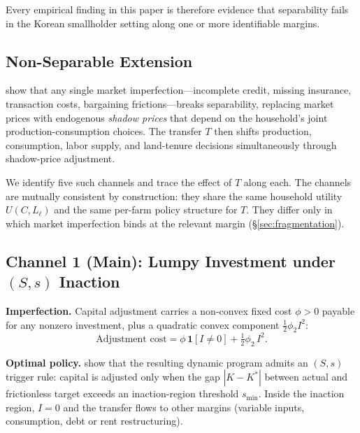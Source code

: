 Every empirical finding in this paper is therefore evidence that separability fails in the Korean smallholder setting along one or more identifiable margins.

\subsection{Non-Separable Extension}
\label{sec:nonseparable}

\citet{deJanvryFafchampsSadoulet1991_peasant} show that any single market imperfection---incomplete credit, missing insurance, transaction costs, bargaining frictions---breaks separability, replacing market prices with endogenous \emph{shadow prices} that depend on the household's joint production-consumption choices. The transfer $T$ then shifts production, consumption, labor supply, and land-tenure decisions simultaneously through shadow-price adjustment.

We identify five such channels and trace the effect of $T$ along each. The channels are mutually consistent by construction: they share the same household utility $U(C, L_\ell)$ and the same per-farm policy structure for $T$. They differ only in which market imperfection binds at the relevant margin (\S\ref{sec:fragmentation}).

\subsection{Channel 1 (Main): Lumpy Investment under $(S,s)$ Inaction}
\label{sec:ch1-ss}

\textbf{Imperfection.} Capital adjustment carries a non-convex fixed cost $\phi > 0$ payable for any nonzero investment, plus a quadratic convex component $\tfrac{1}{2}\phi_2 I^2$:
\begin{equation}
\text{Adjustment cost} = \phi\, \mathbf{1}[I \ne 0] + \tfrac{1}{2}\phi_2\, I^2.
\label{eq:adjustment-cost}
\end{equation}

\textbf{Optimal policy.} \citet{CaballeroEngel1999_lumpy} show that the resulting dynamic program admits an $(S,s)$ trigger rule: capital is adjusted only when the gap $|K - K^*|$ between actual and frictionless target exceeds an inaction-region threshold $s_{\min}$. Inside the inaction region, $I = 0$ and the transfer flows to other margins (variable inputs, consumption, debt or rent restructuring).


